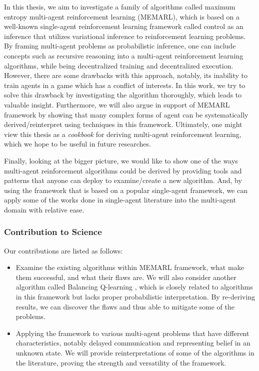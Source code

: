 In this thesis, we aim to investigate a family of algorithms called maximum entropy multi-agent reinforcement learning (MEMARL), which is based on a well-known single-agent reinforcement learning framework called control as an inference that utilizes variational inference to reinforcement learning problems. By framing multi-agent problems as probabilistic inference, one can include concepts such as recursive reasoning \cite{wen2019probabilistic, wen2019multi} into a multi-agent reinforcement learning algorithms, while being decentralized training and decentralized execution. However, there are some drawbacks with this approach, notably, its inability to train agents in a game which has a conflict of interests. In this work, we try to solve this drawback by investigating the algorithm thoroughly, which leads to valuable insight. Furthermore, we will also argue in support of MEMARL framework by showing that many complex forms of agent can be systematically derived/reinterpret using techniques in this framework. Ultimately, one might view this thesis as a \textit{cookbook} for deriving multi-agent reinforcement learning, which we hope to be useful in future researches. 

Finally, looking at the bigger picture, we would like to show one of the ways multi-agent reinforcement algorithms could be derived by providing tools and patterns that anyone can deploy to examine/create a new algorithm. And, by using the framework that is based on a popular single-agent framework, we can apply some of the works done in single-agent literature into the multi-agent domain with relative ease. 

\subsubsection*{Contribution to Science}
Our contributions are listed as follows:
\begin{itemize}
    \item Examine the existing algorithms within MEMARL framework, what make them successful, and what their flaws are. We will also consider another algorithm called Balancing Q-learning \cite{grau2018balancing}, which is closely related to algorithms in this framework but lacks proper probabilistic interpretation. By re-deriving results, we can discover the flaws and thus able to mitigate some of the problems. 
    \item Applying the framework to various multi-agent problems that have different characteristics, notably delayed communication and representing belief in an unknown state. We will provide reinterpretations of some of the algorithms in the literature, proving the strength and versatility of the framework.
\end{itemize}